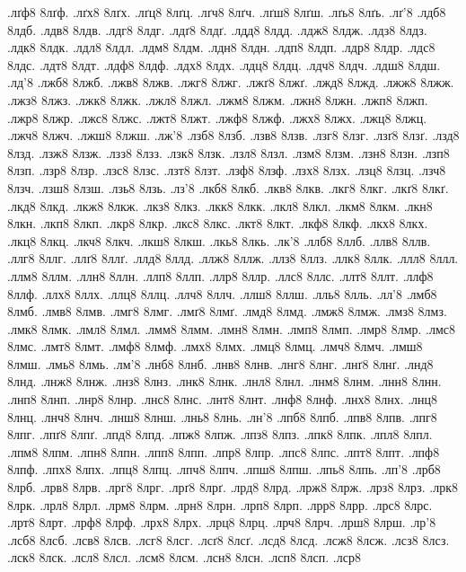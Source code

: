 {.лґф8
8лґф.
.лґх8
8лґх.
.лґц8
8лґц.
.лґч8
8лґч.
.лґш8
8лґш.
.лґь8
8лґь.
.лґ'8
.лдб8
8лдб.
.лдв8
8лдв.
.лдг8
8лдг.
.лдґ8
8лдґ.
.лдд8
8лдд.
.лдж8
8лдж.
.лдз8
8лдз.
.лдк8
8лдк.
.лдл8
8лдл.
.лдм8
8лдм.
.лдн8
8лдн.
.лдп8
8лдп.
.лдр8
8лдр.
.лдс8
8лдс.
.лдт8
8лдт.
.лдф8
8лдф.
.лдх8
8лдх.
.лдц8
8лдц.
.лдч8
8лдч.
.лдш8
8лдш.
.лд'8
.лжб8
8лжб.
.лжв8
8лжв.
.лжг8
8лжг.
.лжґ8
8лжґ.
.лжд8
8лжд.
.лжж8
8лжж.
.лжз8
8лжз.
.лжк8
8лжк.
.лжл8
8лжл.
.лжм8
8лжм.
.лжн8
8лжн.
.лжп8
8лжп.
.лжр8
8лжр.
.лжс8
8лжс.
.лжт8
8лжт.
.лжф8
8лжф.
.лжх8
8лжх.
.лжц8
8лжц.
.лжч8
8лжч.
.лжш8
8лжш.
.лж'8
.лзб8
8лзб.
.лзв8
8лзв.
.лзг8
8лзг.
.лзґ8
8лзґ.
.лзд8
8лзд.
.лзж8
8лзж.
.лзз8
8лзз.
.лзк8
8лзк.
.лзл8
8лзл.
.лзм8
8лзм.
.лзн8
8лзн.
.лзп8
8лзп.
.лзр8
8лзр.
.лзс8
8лзс.
.лзт8
8лзт.
.лзф8
8лзф.
.лзх8
8лзх.
.лзц8
8лзц.
.лзч8
8лзч.
.лзш8
8лзш.
.лзь8
8лзь.
.лз'8
.лкб8
8лкб.
.лкв8
8лкв.
.лкг8
8лкг.
.лкґ8
8лкґ.
.лкд8
8лкд.
.лкж8
8лкж.
.лкз8
8лкз.
.лкк8
8лкк.
.лкл8
8лкл.
.лкм8
8лкм.
.лкн8
8лкн.
.лкп8
8лкп.
.лкр8
8лкр.
.лкс8
8лкс.
.лкт8
8лкт.
.лкф8
8лкф.
.лкх8
8лкх.
.лкц8
8лкц.
.лкч8
8лкч.
.лкш8
8лкш.
.лкь8
8лкь.
.лк'8
.ллб8
8ллб.
.ллв8
8ллв.
.ллг8
8ллг.
.ллґ8
8ллґ.
.ллд8
8ллд.
.ллж8
8ллж.
.ллз8
8ллз.
.ллк8
8ллк.
.ллл8
8ллл.
.ллм8
8ллм.
.ллн8
8ллн.
.ллп8
8ллп.
.ллр8
8ллр.
.ллс8
8ллс.
.ллт8
8ллт.
.ллф8
8ллф.
.ллх8
8ллх.
.ллц8
8ллц.
.ллч8
8ллч.
.ллш8
8ллш.
.лль8
8лль.
.лл'8
.лмб8
8лмб.
.лмв8
8лмв.
.лмг8
8лмг.
.лмґ8
8лмґ.
.лмд8
8лмд.
.лмж8
8лмж.
.лмз8
8лмз.
.лмк8
8лмк.
.лмл8
8лмл.
.лмм8
8лмм.
.лмн8
8лмн.
.лмп8
8лмп.
.лмр8
8лмр.
.лмс8
8лмс.
.лмт8
8лмт.
.лмф8
8лмф.
.лмх8
8лмх.
.лмц8
8лмц.
.лмч8
8лмч.
.лмш8
8лмш.
.лмь8
8лмь.
.лм'8
.лнб8
8лнб.
.лнв8
8лнв.
.лнг8
8лнг.
.лнґ8
8лнґ.
.лнд8
8лнд.
.лнж8
8лнж.
.лнз8
8лнз.
.лнк8
8лнк.
.лнл8
8лнл.
.лнм8
8лнм.
.лнн8
8лнн.
.лнп8
8лнп.
.лнр8
8лнр.
.лнс8
8лнс.
.лнт8
8лнт.
.лнф8
8лнф.
.лнх8
8лнх.
.лнц8
8лнц.
.лнч8
8лнч.
.лнш8
8лнш.
.лнь8
8лнь.
.лн'8
.лпб8
8лпб.
.лпв8
8лпв.
.лпг8
8лпг.
.лпґ8
8лпґ.
.лпд8
8лпд.
.лпж8
8лпж.
.лпз8
8лпз.
.лпк8
8лпк.
.лпл8
8лпл.
.лпм8
8лпм.
.лпн8
8лпн.
.лпп8
8лпп.
.лпр8
8лпр.
.лпс8
8лпс.
.лпт8
8лпт.
.лпф8
8лпф.
.лпх8
8лпх.
.лпц8
8лпц.
.лпч8
8лпч.
.лпш8
8лпш.
.лпь8
8лпь.
.лп'8
.лрб8
8лрб.
.лрв8
8лрв.
.лрг8
8лрг.
.лрґ8
8лрґ.
.лрд8
8лрд.
.лрж8
8лрж.
.лрз8
8лрз.
.лрк8
8лрк.
.лрл8
8лрл.
.лрм8
8лрм.
.лрн8
8лрн.
.лрп8
8лрп.
.лрр8
8лрр.
.лрс8
8лрс.
.лрт8
8лрт.
.лрф8
8лрф.
.лрх8
8лрх.
.лрц8
8лрц.
.лрч8
8лрч.
.лрш8
8лрш.
.лр'8
.лсб8
8лсб.
.лсв8
8лсв.
.лсг8
8лсг.
.лсґ8
8лсґ.
.лсд8
8лсд.
.лсж8
8лсж.
.лсз8
8лсз.
.лск8
8лск.
.лсл8
8лсл.
.лсм8
8лсм.
.лсн8
8лсн.
.лсп8
8лсп.
.лср8
}
